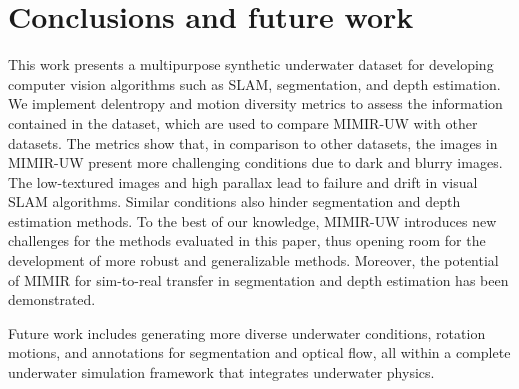 \section{Conclusions and future work} 
\label{mimir:sec:conclusions}

This work presents a multipurpose synthetic underwater dataset for developing computer vision algorithms such as SLAM, segmentation, and depth estimation. 
We implement delentropy and motion diversity metrics to assess the information contained in the dataset, which are used to compare MIMIR-UW with other datasets. The metrics show that, in comparison to other datasets, the images in MIMIR-UW present more challenging conditions due to dark and blurry images.
The low-textured images and high parallax lead to failure and drift in visual SLAM algorithms. 
Similar conditions also hinder segmentation and depth estimation methods. To the best of our knowledge, MIMIR-UW introduces new challenges for the methods evaluated in this paper, thus opening room for the development of more robust and generalizable methods. Moreover, the potential of MIMIR for sim-to-real transfer in segmentation and depth estimation has been demonstrated.

Future work includes generating more diverse underwater conditions, rotation motions, and annotations for segmentation and optical flow, all within a complete underwater simulation framework that integrates underwater physics.
